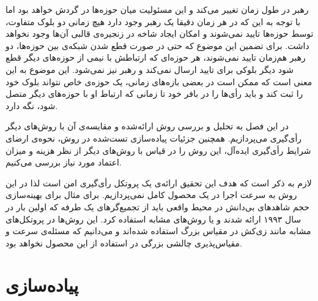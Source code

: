 \par 
رهبر در طول زمان تغییر می‌کند و این مسئولیت میان حوزه‌ها در گردش خواهد بود اما با توجه  به این که در هر زمان دقیقا یک رهبر وجود دارد هیچ زمانی دو بلوک متفاوت، توسط حوزه‌ها تایید نمی‌شوند و امکان ایجاد شاخه در زنجیره‌ی قالبی آن‌ها وجود نخواهد داشت. برای تضمین این موضوع که حتی در صورت قطع شدن شبکه‌ی بین حوزه‌ها، دو رهبر هم‌زمان تایید نمی‌شوند، هر حوزه‌ای که ارتباطش با نیمی از حوزه‌های دیگر قطع شود دیگر بلوکی برای تایید ارسال نمی‌کند و رهبر نیز نمی‌شود. این موضوع به این معنی است که ممکن است در بعضی بازه‌های زمانی، یک حوزه‌ی خاص نتواند بلوک خود را ثبت کند و باید رأی‌ها را در بافر خود تا زمانی که ارتباط او با حوزه‌های دیگر متصل شود، نگه‌ دارد.

در این فصل به تحلیل و بررسی روش ارائه‌شده و مقایسه‌ی آن با روش‌های دیگر رأی‌گیری می‌پردازیم. همچنین جزئیات پیاده‌سازی تست‌شده در روش، نحوه‌ی ارضای شرایط رأی‌گیری ایده‌آل، این روش را در قیاس با روش‌های دیگر از نظر هزینه و میزان اعتماد مورد نیاز بررسی می‌کنیم. 
\par
لازم به ذکر است که هدف این تحقیق ارائه‌ی یک پروتکل رأی‌گیری امن است لذا در این روش به سرعت اجرا در یک محصول کامل نمی‌پردازیم. برای مثال برای بهینه‌سازی حجم شاهد‌های بی‌دانش در محیط واقعی باید از تجمیع‌گر‌های یک طرفه 
که اولین بار در سال ۱۹۹۳ 
\cite{oneway}
ارائه شدند و یا روش‌های مشابه استفاده کرد. این روش‌ها در پروتکل‌های مشابه مانند زی‌کش در مقیاس بزرگ استفاده‌ شده‌اند و می‌دانیم که مسئله‌ی سرعت و مقیاس‌پذیری چالشی بزرگی در استفاده از این محصول نخواهد بود.

\section{پیاده‌سازی}

